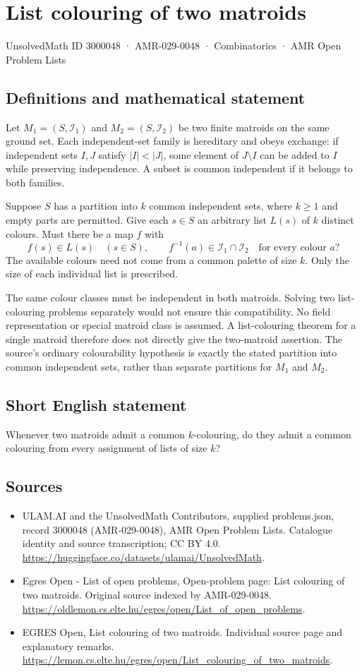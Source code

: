 \documentclass[11pt,a4paper]{article}
\begin{document}
\section*{List colouring of two matroids}\label{3000048}
{\small UnsolvedMath ID 3000048 · AMR-029-0048 · Combinatorics · AMR Open Problem Lists}
\subsection{Definitions and mathematical statement}
Let $M_1=(S,\mathcal I_1)$ and $M_2=(S,\mathcal I_2)$ be two finite
matroids on the same ground set. Each independent-set family is
hereditary and obeys exchange: if independent sets $I,J$ satisfy
$|I|<|J|$, some element of $J\setminus I$ can be added to $I$
while preserving independence. A subset is common independent if
it belongs to both families.

Suppose $S$ has a partition into $k$ common independent sets, where
$k\ge1$ and empty parts are permitted. Give each $s\in S$ an arbitrary
list $L(s)$ of $k$ distinct colours. Must there be a map $f$ with
\[
 f(s)\in L(s)\quad(s\in S),\qquad
 f^{-1}(a)\in\mathcal I_1\cap\mathcal I_2
                                  \quad\text{for every colour }a?
\]
The available colours need not come from a common palette of size $k$.
Only the size of each individual list is prescribed.

The same colour classes must be independent in both matroids.
Solving two list-colouring problems separately would not ensure this
compatibility. No field representation or special matroid class is
assumed. A list-colouring theorem for a single matroid therefore does
not directly give the two-matroid assertion. The source's ordinary
colourability hypothesis is exactly the stated partition into common
independent sets, rather than separate partitions for $M_1$ and $M_2$.
\subsection{Short English statement}
Whenever two matroids admit a common $k$-colouring, do they admit
a common colouring from every assignment of lists of size $k$?
\subsection{Sources}
\begin{itemize}
\item[S1] ULAM.AI and the UnsolvedMath Contributors, supplied problems.json, record 3000048 (AMR-029-0048), AMR Open Problem Lists. Catalogue identity and source transcription; CC BY 4.0.
\url{https://huggingface.co/datasets/ulamai/UnsolvedMath}.
\item[S2] Egres Open - List of open problems, Open-problem page: List colouring of two matroids. Original source indexed by AMR-029-0048.
\url{https://oldlemon.cs.elte.hu/egres/open/List_of_open_problems}.
\item[S3] EGRES Open, List colouring of two matroids. Individual source page and explanatory remarks.
\url{https://lemon.cs.elte.hu/egres/open/List_colouring_of_two_matroids}.
\end{itemize}
\end{document}
